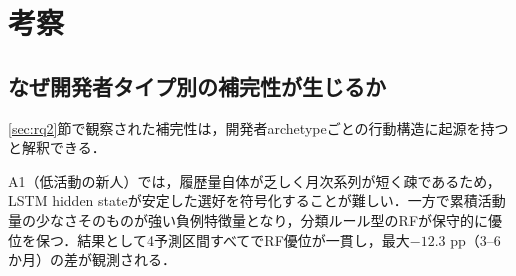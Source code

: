 \documentclass[submit,noauthor,ses,dvipdfmx]{ipsj}
\begin{document}





\section{考察}\label{sec:discuss}

\subsection{なぜ開発者タイプ別の補完性が生じるか}
\ref{sec:rq2}節で観察された補完性は，開発者archetypeごとの行動構造に起源を持つと解釈できる．

A1（低活動の新人）では，履歴量自体が乏しく月次系列が短く疎であるため，LSTM hidden stateが安定した選好を符号化することが難しい．一方で累積活動量の少なさそのものが強い負例特徴量となり，分類ルール型のRFが保守的に優位を保つ．結果として4予測区間すべてでRF優位が一貫し，最大$-12.3$ pp（3--6か月）の差が観測される．
\end{document}
